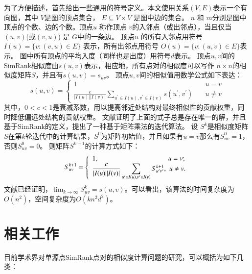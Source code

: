 \documentclass[master]{njuthesis}
\begin{document}
为了方便描述，首先给出一些通用的符号定义。本文使用关系$(V, E)$表示一个有向图，其中 $V$是图的顶点集合，
$E \subseteq V \times V$ 是图中边的集合。
$n$ 和 $m$分别是图中顶点的个数、边的个数。顶点$u$ 称作顶点 $v$的入邻点（或出邻点），当且仅当$(u, v)$(或$(v,u)$) 是 $G$中的一条边。
顶点$u$ 的所有入邻点用符号 $I(u)=\{v: (v, u) \in E\}$ 表示，所有出邻点用符号 $O(u)=\{v: (u, v) \in E\}$表示。
图中所有顶点的平均入度（同样也是出度）用符号$d$表示。
顶点$u, v$间的SimRank相似度由$s(u, v)$表示，相应地，所有点对的相似度可以写作 $n\times n$的相似度矩阵$S$，并且有$s(u, v)=s_{uv}$。
顶点$u, v$间的相似值用数学公式如下表达：
\begin{equation}
s(u, v) = \left\{
        \begin{array}{ll}
	1 & \quad u = v  \\
	\displaystyle\frac{c}{|I(u)||I(v)|}\displaystyle\sum_{u^\prime \in I(u), v^\prime \in I(v)} s(u^\prime, v^\prime) & \quad u \ne v
        \end{array}
    \right.
	\label{eq:one}
\end{equation}
其中，$0 < c < 1$是衰减系数，用以提高邻近处结构对最终相似性的贡献权重，同时降低偏远处结构的贡献权重。
文献\cite{jeh2002simrank}证明了上面的式子总是存在唯一的解，并且基于SimRank的定义，提出了一种基于矩阵乘法的迭代算法。
设 $S^k$是相似度矩阵$S$在第$k$轮迭代中的计算结果，$S^0$为矩阵初始值，并且如果有$u = v$那么有$S^0_{uv} = 1$，否则$S^0_{uv} = 0$。
则矩阵$S^{k+1}$的计算方式如下：
\begin{equation}
S^{k+1}_{uv} = \left\{
        \begin{array}{ll}
	1, &\hspace{-0.5em}  \! u = v ; \\
	\displaystyle\frac{c}{|I(u)||I(v)|}\displaystyle\sum_{u^\prime \in I(u), v^\prime \in I(v)} S^{k+1}_{u^\prime v^\prime} , & \hspace{-0.5em} u \ne v.
        \end{array}
    \right.
	\label{eq:two}
\end{equation}
文献\cite{jeh2002simrank}已经证明，$\lim_{k\to\infty}S^k_{uv} = s(u,v)$。可以看出，该算法的时间复杂度为$O(n^2)$，空间复杂度为$O(kn^2d^2)$。

\section{相关工作}
目前学术界对单源点SimRank点对的相似度计算问题的研究，可以概括为如下几类：
\end{document}
